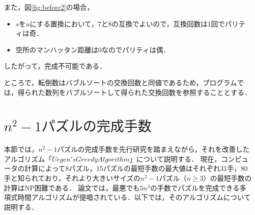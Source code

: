 また，図\ref{fig:before2}の場合，
\begin{itemize}
 \item \(s\)を\(u\)にする置換において，7と8の互換でよいので，互換回数は1回でパリティは奇．
 \item 空所のマンハッタン距離は0なのでパリティは偶．
\end{itemize}
したがって，完成不可能である．

ところで，転倒数はバブルソートの交換回数と同値であるため，プログラムでは，得られた数列をバブルソートして得られた交換回数を参照することとする．

\section{\(n^2-1パズルの完成手数\)}
本節では，\(n^2-1\)パズルの完成手数を先行研究\cite{Ian}を踏まえながら，それを改善したアルゴリズム「\(Uegen's Greedy Algorithm\)」について説明する．
現在，コンピュータの計算によって8パズル，15パズルの最短手数の最大値はそれぞれ31手，80手と知られており，それより大きいサイズの\(n^2-1\)パズル\(（n\geq3）\)の最短手数の計算はNP困難である\cite{Daniel}．
論文\cite{Ian}では，最悪でも\(5n^3\)の手数でパズルを完成できる多項式時間アルゴリズムが提唱されている．以下では，そのアルゴリズムについて説明する．

